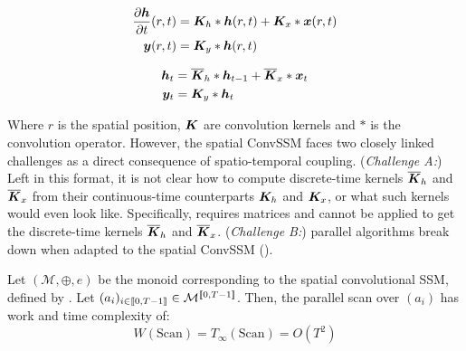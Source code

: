 \documentclass{article}
\begin{document}
\begin{minipage}[t]{.45\linewidth}
\vspace{-5mm}
  \begin{subequations}
    \label{eq:conv_ssm_continuous}
    \begin{align}
    \label{eq:conv_ssm_continuous:1}
      \frac{\partial \bm{h}}{\partial t}(r,t) &= \bm{K}_h \ast \bm{h}(r, t) + \bm{K}_x \ast \bm{x}(r, t) \\
      \bm{y}(r, t) &= \bm{K}_y \ast \bm{h}(r, t)
    \end{align}
  \end{subequations}
\vspace{-5mm}
\end{minipage}%
\begin{minipage}[t]{.45\linewidth}
\vspace{-5mm}
  \begin{subequations}
    \label{eq:conv_ssm_discrete}
    \begin{align}
    \label{eq:conv_ssm_discrete:1}
      \bm{h}_{t} &= \overline{\bm{K}}_h \ast \bm{h}_{t-1} + \overline{\bm{K}}_x \ast \bm{x}_t \\
    \label{eq:conv_ssm_discrete:2}
      \bm{y}_t &= \bm{K}_y \ast \bm{h}_t
    \end{align}
  \end{subequations}
\vspace{-5mm}
\end{minipage}

Where $r$ is the spatial position, $\bm{K}$ are convolution kernels and $\ast$ is the convolution operator. However, the spatial ConvSSM faces two closely linked challenges as a direct consequence of spatio-temporal coupling.
%
(\emph{Challenge A:}) Left in this format, it is not clear how to compute discrete-time kernels $\overline{\bm{K}}_h$ and $\overline{\bm{K}}_x$ from their continuous-time counterparts $\bm{K}_h$ and $\bm{K}_x$, or what such kernels would even look like. Specifically,  requires matrices and cannot be applied to get the discrete-time kernels $\overline{\bm{K}}_h$ and $\overline{\bm{K}}_x$.
%
(\emph{Challenge B:}) parallel algorithms break down when adapted to the spatial ConvSSM ().

\begin{proposition}
\label{prop:Spatial_ConvSSM_complexity}
    Let $(\mathcal{M}, \oplus, e)$ be the monoid corresponding to the spatial convolutional SSM, defined by . Let $(a_i)_{i\in \llbracket 0, T-1 \rrbracket}\in \mathcal{M}^{\llbracket 0, T-1 \rrbracket}$. Then, the parallel scan over $(a_i)$ has work and time complexity of:
\[
    W(\mathrm{Scan}) = T_\infty(\mathrm{Scan}) = O(T^2)
\]
\end{proposition}
\end{document}
